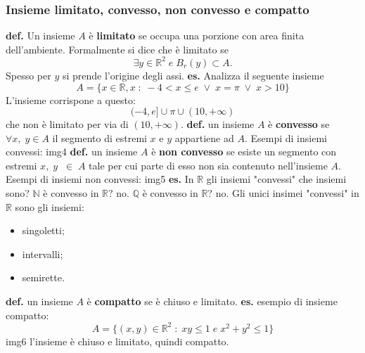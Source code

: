 \subsubsection*{Insieme limitato, convesso, non convesso e compatto}
\textbf{def.} Un insieme $A$ è \textbf{limitato} se occupa una porzione con area finita dell'ambiente. Formalmente si dice che è limitato se
\[
    \exists y \in \mathbb{R}^2 \;e\; B_r(y) \subset A.
\]
Spesso per $y$ si prende l'origine degli assi.
\newline
\newline
\textbf{es.} Analizza il seguente insieme
\[
    A = \{x \in \mathbb{R}, x \;:\; -4 < x \leq e \;\lor\; x = \pi \;\lor\; x > 10\}
\]
L'insieme corrispone a questo:
\[
    (-4,e] \cup {\pi} \cup (10, +\infty)
\]
che non è limitato per via di $(10, +\infty)$.
\newline
\newline
\newline
\textbf{def.} un insieme $A$ è \textbf{convesso}  se $\forall x,\; y \in A$ il segmento di estremi $x$ e $y$ appartiene ad $A$.
\newline
Esempi di insiemi convessi:
\newline
img4
\newline
\newline
\newline
\textbf{def.} un insieme $A$ è \textbf{non convesso} se esiste un segmento con estremi $x,\; y \;\;\in \; A$ tale per cui parte di esso non sia contenuto nell'insieme $A$. 
\newline
Esempi di insiemi non convessi:
\newline
img5
\newline
\newline
\textbf{es.} In $\mathbb{R}$ gli insiemi "convessi" che insiemi sono?
\newline $\mathbb{N}$ è convesso in $\mathbb{R}$? no.
\newline $\mathbb{Q}$ è convesso in $\mathbb{R}$? no.
\newline
Gli unici insimei "convessi" in $\mathbb{R}$ sono gli insiemi:
\begin{itemize}
    \item singoletti;
    \item intervalli;
    \item semirette.
\end{itemize}
\textbf{def.} un insieme $A$ è \textbf{compatto} se è chiuso e limitato.
\newline
\newline
\textbf{es.} esempio di insieme compatto:
\[
    A =\{ (x,y) \in \mathbb{R}^2 \;:\; xy \leq1 \;e\; x^2+y^2 \leq 1 \}
\]
img6
\newline
l'insieme è chiuso e limitato, quindi compatto.
\newline
\newline
\newline

